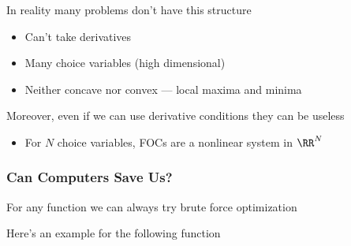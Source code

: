 \begin{frame}
    
    In reality many problems don't have this structure

    \begin{itemize}
        \item Can't take derivatives
            \vspace{1em}
        \item Many choice variables (high dimensional)
            \vspace{1em}
        \item Neither concave nor convex --- local maxima and minima
    \end{itemize}



    \vspace{1em}

    Moreover, even if we can use derivative conditions they can be useless

    \begin{itemize}
        \item For $N$ choice variables, FOCs are a nonlinear system in $\RR^N$
    \end{itemize}


\end{frame}


\begin{frame}
    \frametitle{Can Computers Save Us?}

    For any function we can always try brute force optimization

    \vspace{2em}

    Here's an example for the following function

\end{frame}




